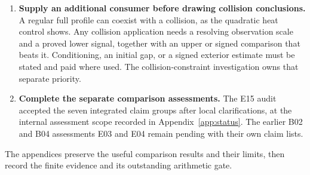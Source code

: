 \begin{enumerate}[leftmargin=*,itemsep=0.55em]
\item \textbf{Supply an additional consumer before drawing collision conclusions.}
A regular full profile can coexist with a collision, as the quadratic
heat control shows. Any collision application needs a resolving
observation scale and a proved lower signal, together with an upper or
signed comparison that beats it. Conditioning, an initial gap, or a
signed exterior estimate must be stated and paid where used. The
collision-constraint investigation owns that separate priority.

\item \textbf{Complete the separate comparison assessments.}
The E15 audit accepted the seven integrated claim groups after local
clarifications, at the internal assessment scope recorded in
Appendix~\ref{app:status}. The earlier B02 and B04 assessments E03 and E04
remain pending with their own claim lists.
\end{enumerate}

The appendices preserve the useful comparison results and their limits,
then record the finite evidence and its outstanding arithmetic gate.

